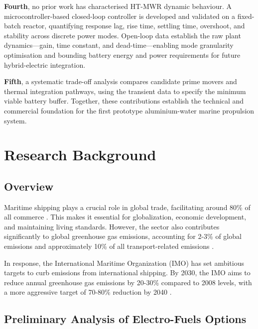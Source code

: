 \documentclass[12pt]{article}
\begin{document}
\textbf{Fourth}, no prior work has characterised HT-MWR dynamic behaviour. A microcontroller-based closed-loop controller is developed and validated on a fixed-batch reactor, quantifying response lag, rise time, settling time, overshoot, and stability across discrete power modes. Open-loop data establish the raw plant dynamics---gain, time constant, and dead-time---enabling mode granularity optimisation and bounding battery energy and power requirements for future hybrid-electric integration.

\textbf{Fifth}, a systematic trade-off analysis compares candidate prime movers and thermal integration pathways, using the transient data to specify the minimum viable battery buffer. Together, these contributions establish the technical and commercial foundation for the first prototype aluminium-water marine propulsion system.

\break

\tableofcontents

\listoftables

\break

\listoffigures

\break

\section{Research Background}

\subsection*{Overview}

Maritime shipping plays a crucial role in global trade, facilitating around 80\% of all commerce \cite{owid-co2-emissions-from-transport}. This makes it essential for globalization, economic development, and maintaining living standards. However, the sector also contributes significantly to global greenhouse gas emissions, accounting for 2-3\% of global emissions and approximately 10\% of all transport-related emissions \cite{owid-ghg-emissions-by-sector, owid-co2-emissions-from-transport}.

In response, the International Maritime Organization (IMO) has set ambitious targets to curb emissions from international shipping. By 2030, the IMO aims to reduce annual greenhouse gas emissions by 20-30\% compared to 2008 levels, with a more aggressive target of 70-80\% reduction by 2040 \cite{imo-target}.

\subsection{Preliminary Analysis of Electro-Fuels Options}
\label{subsec:preliminary-analysis}
\end{document}
